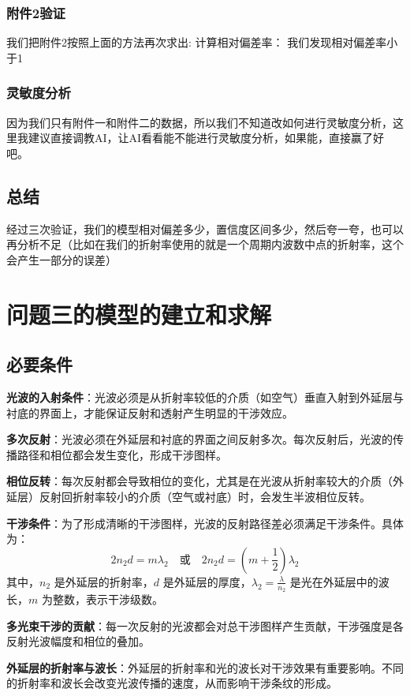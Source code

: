 \documentclass{cumcmthesis}
\begin{document}
\subsubsection{附件2验证}
我们把附件2按照上面的方法再次求出:
计算相对偏差率：
我们发现相对偏差率小于1


\subsubsection{灵敏度分析}
因为我们只有附件一和附件二的数据，所以我们不知道改如何进行灵敏度分析，这里我建议直接调教AI，让AI看看能不能进行灵敏度分析，如果能，直接赢了好吧。
\subsection{总结}
经过三次验证，我们的模型相对偏差多少，置信度区间多少，然后夸一夸，也可以再分析不足（比如在我们的折射率使用的就是一个周期内波数中点的折射率，这个会产生一部分的误差）

\section{问题三的模型的建立和求解}
\subsection{必要条件}
\textbf{光波的入射条件}：光波必须是从折射率较低的介质（如空气）垂直入射到外延层与衬底的界面上，才能保证反射和透射产生明显的干涉效应。

\textbf{多次反射}：光波必须在外延层和衬底的界面之间反射多次。每次反射后，光波的传播路径和相位都会发生变化，形成干涉图样。

\textbf{相位反转}：每次反射都会导致相位的变化，尤其是在光波从折射率较大的介质（外延层）反射回折射率较小的介质（空气或衬底）时，会发生半波相位反转。

\textbf{干涉条件}：为了形成清晰的干涉图样，光波的反射路径差必须满足干涉条件。具体为：
	\[
	2 n_2 d = m \lambda_2 \quad \text{或} \quad 2 n_2 d = \left( m + \frac{1}{2} \right) \lambda_2
	\]
	其中，\( n_2 \) 是外延层的折射率，\( d \) 是外延层的厚度，\( \lambda_2 = \frac{\lambda}{n_2} \) 是光在外延层中的波长，\( m \) 为整数，表示干涉级数。

\textbf{多光束干涉的贡献}：每一次反射的光波都会对总干涉图样产生贡献，干涉强度是各反射光波幅度和相位的叠加。

\textbf{外延层的折射率与波长}：外延层的折射率和光的波长对干涉效果有重要影响。不同的折射率和波长会改变光波传播的速度，从而影响干涉条纹的形成。
\end{document}

